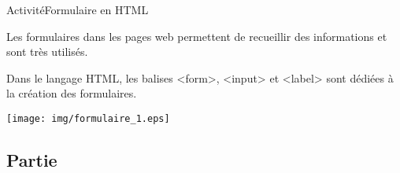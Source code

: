 \documentclass[11pt,a4paper]{article}
\newcounter{numexo}
\begin{document}
\begin{NSI}
{Activité}{Formulaire en HTML}
\end{NSI}

Les formulaires dans les pages web permettent de recueillir des informations et sont très utilisés. 

Dans le langage HTML, les balises \textsf{<form>}, \textsf{<input>} et \textsf{<label>} sont dédiées à la création des formulaires. 

\begin{center}
\texttt{[image: img/formulaire\_1.eps]}
\end{center}



\addtocounter{numexo}{1}
\subsection*{\Large Partie \thenumexo }
\end{document}
